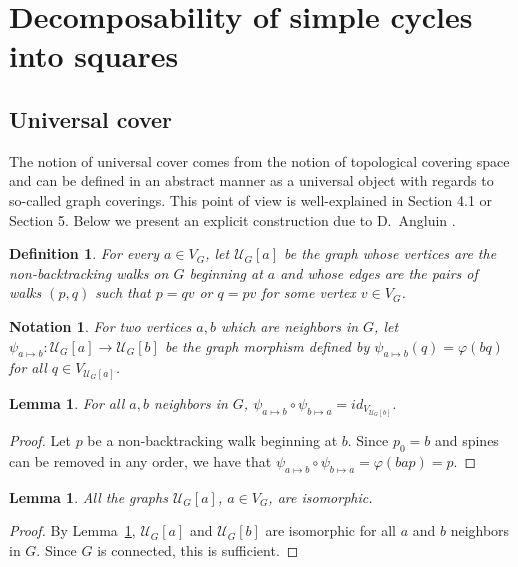 \documentclass{article}
\newtheorem{lemma}[theorem]{Lemma}
\newtheorem{definition}[theorem]{Definition}
\newtheorem{notation}[theorem]{Notation}
\begin{document}
\section{Decomposability of simple cycles into squares\label{section.decomposability}}

\subsection{Universal cover\label{section.universal}}


The notion of universal cover comes from the notion of topological covering space and can be defined in an abstract manner as a universal object with regards to so-called graph coverings. This point of view is well-explained in \cite{S83} Section 4.1 or \cite{CM18} Section 5. Below we present an explicit construction due to D.~Angluin \cite{A80}.

\begin{definition}
For every $a \in V_G$, let $\mathcal{U}_G[a]$ be the graph whose vertices are the non-backtracking walks on $G$ beginning at $a$ and whose edges are the pairs of walks $(p,q)$ such that $p = qv$ or $q = pv$ for some vertex $v \in V_G$. 
\end{definition}

\begin{notation}
For two vertices $a,b$ which are neighbors in $G$, let $\psi_{a \mapsto b} : \mathcal{U}_G[a] \rightarrow \mathcal{U}_G[b]$ be the graph morphism defined by 
$\psi_{a \mapsto b}(q) = \varphi(b q)$ for all $q \in V_{\mathcal{U}_G[a]}$. 
\end{notation}

\begin{lemma}\label{lemma.morphism}
For all $a,b$ neighbors in $G$, 
$\psi_{a \mapsto b} \circ \psi_{b \mapsto a} = id_{V_{\mathcal{U}_G[b]}}$.
\end{lemma}

\begin{proof}
Let $p$ be a non-backtracking walk beginning at $b$. Since $p_0 = b$ and spines can be removed in any order, we have that $\psi_{a \mapsto b} \circ \psi_{b \mapsto a} = \varphi(bap) = p$.
\end{proof} 

\begin{lemma}
All the graphs $\mathcal{U}_G[a]$, $a \in V_G$, are isomorphic. 
\end{lemma}

\begin{proof}
By Lemma~\ref{lemma.morphism}, $\mathcal{U}_G[a]$ and $\mathcal{U}_G[b]$
are isomorphic for all $a$ and $b$ neighbors in $G$. Since $G$ is connected, this is sufficient. 
\end{proof}
\end{document}
